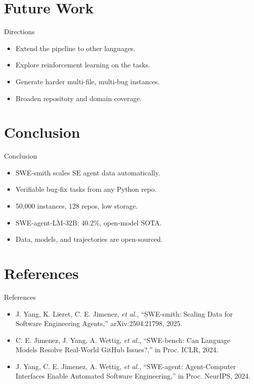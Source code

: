 \documentclass{beamer}
\begin{document}
\section{Future Work}
\begin{frame}{Directions}
\begin{itemize}
\item Extend the pipeline to other languages.
\item Explore reinforcement learning on the tasks.
\item Generate harder multi-file, multi-bug instances.
\item Broaden repository and domain coverage.
\end{itemize}
\end{frame}

\section{Conclusion}
\begin{frame}{Conclusion}
\begin{itemize}
\item SWE-smith scales SE agent data automatically.
\item Verifiable bug-fix tasks from any Python repo.
\item 50{,}000 instances, 128 repos, low storage.
\item SWE-agent-LM-32B: 40.2\%, open-model SOTA.
\item Data, models, and trajectories are open-sourced.
\end{itemize}
\end{frame}

\section{References}
\begin{frame}{References}
\footnotesize
\begin{itemize}
\item J. Yang, K. Lieret, C. E. Jimenez, \emph{et al.}, ``SWE-smith: Scaling Data for Software Engineering Agents,'' arXiv:2504.21798, 2025.
\item C. E. Jimenez, J. Yang, A. Wettig, \emph{et al.}, ``SWE-bench: Can Language Models Resolve Real-World GitHub Issues?,'' in Proc. ICLR, 2024.
\item J. Yang, C. E. Jimenez, A. Wettig, \emph{et al.}, ``SWE-agent: Agent-Computer Interfaces Enable Automated Software Engineering,'' in Proc. NeurIPS, 2024.
\end{itemize}
\end{frame}
\begin{frame}\vfill{}\vfill\end{frame}
\end{document}
